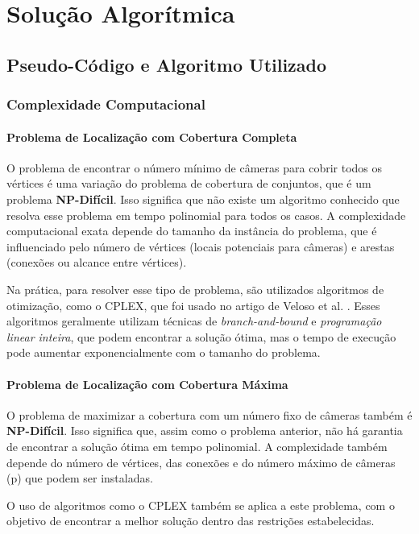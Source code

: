 \documentclass[12pt, a4paper]{report}
\begin{document}
\chapter{Solução Algorítmica}

\section{Pseudo-Código e Algoritmo Utilizado}

\subsection{Complexidade Computacional}

\subsubsection{Problema de Localização com Cobertura Completa}
O problema de encontrar o número mínimo de câmeras para cobrir todos os vértices é uma variação do problema de cobertura de conjuntos, que é um problema \textbf{NP-Difícil}. Isso significa que não existe um algoritmo conhecido que resolva esse problema em tempo polinomial para todos os casos. A complexidade computacional exata depende do tamanho da instância do problema, que é influenciado pelo número de vértices (locais potenciais para câmeras) e arestas (conexões ou alcance entre vértices).

Na prática, para resolver esse tipo de problema, são utilizados algoritmos de otimização, como o CPLEX, que foi usado no artigo de Veloso et al. \cite{veloso2021localizacao}. Esses algoritmos geralmente utilizam técnicas de \textit{branch-and-bound} e \textit{programação linear inteira}, que podem encontrar a solução ótima, mas o tempo de execução pode aumentar exponencialmente com o tamanho do problema.

\subsubsection{Problema de Localização com Cobertura Máxima}
O problema de maximizar a cobertura com um número fixo de câmeras também é \textbf{NP-Difícil}. Isso significa que, assim como o problema anterior, não há garantia de encontrar a solução ótima em tempo polinomial. A complexidade também depende do número de vértices, das conexões e do número máximo de câmeras (p) que podem ser instaladas.

O uso de algoritmos como o CPLEX também se aplica a este problema, com o objetivo de encontrar a melhor solução dentro das restrições estabelecidas.
\end{document}
